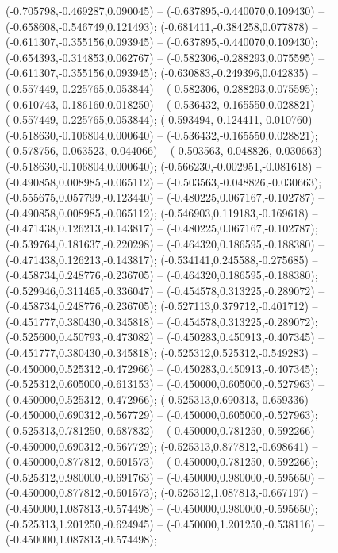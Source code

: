  (-0.705798,-0.469287,0.090045) -- (-0.637895,-0.440070,0.109430) -- (-0.658608,-0.546749,0.121493);
 (-0.681411,-0.384258,0.077878) -- (-0.611307,-0.355156,0.093945) -- (-0.637895,-0.440070,0.109430);
 (-0.654393,-0.314853,0.062767) -- (-0.582306,-0.288293,0.075595) -- (-0.611307,-0.355156,0.093945);
 (-0.630883,-0.249396,0.042835) -- (-0.557449,-0.225765,0.053844) -- (-0.582306,-0.288293,0.075595);
 (-0.610743,-0.186160,0.018250) -- (-0.536432,-0.165550,0.028821) -- (-0.557449,-0.225765,0.053844);
 (-0.593494,-0.124411,-0.010760) -- (-0.518630,-0.106804,0.000640) -- (-0.536432,-0.165550,0.028821);
 (-0.578756,-0.063523,-0.044066) -- (-0.503563,-0.048826,-0.030663) -- (-0.518630,-0.106804,0.000640);
 (-0.566230,-0.002951,-0.081618) -- (-0.490858,0.008985,-0.065112) -- (-0.503563,-0.048826,-0.030663);
 (-0.555675,0.057799,-0.123440) -- (-0.480225,0.067167,-0.102787) -- (-0.490858,0.008985,-0.065112);
 (-0.546903,0.119183,-0.169618) -- (-0.471438,0.126213,-0.143817) -- (-0.480225,0.067167,-0.102787);
 (-0.539764,0.181637,-0.220298) -- (-0.464320,0.186595,-0.188380) -- (-0.471438,0.126213,-0.143817);
 (-0.534141,0.245588,-0.275685) -- (-0.458734,0.248776,-0.236705) -- (-0.464320,0.186595,-0.188380);
 (-0.529946,0.311465,-0.336047) -- (-0.454578,0.313225,-0.289072) -- (-0.458734,0.248776,-0.236705);
 (-0.527113,0.379712,-0.401712) -- (-0.451777,0.380430,-0.345818) -- (-0.454578,0.313225,-0.289072);
 (-0.525600,0.450793,-0.473082) -- (-0.450283,0.450913,-0.407345) -- (-0.451777,0.380430,-0.345818);
 (-0.525312,0.525312,-0.549283) -- (-0.450000,0.525312,-0.472966) -- (-0.450283,0.450913,-0.407345);
 (-0.525312,0.605000,-0.613153) -- (-0.450000,0.605000,-0.527963) -- (-0.450000,0.525312,-0.472966);
 (-0.525313,0.690313,-0.659336) -- (-0.450000,0.690312,-0.567729) -- (-0.450000,0.605000,-0.527963);
 (-0.525313,0.781250,-0.687832) -- (-0.450000,0.781250,-0.592266) -- (-0.450000,0.690312,-0.567729);
 (-0.525313,0.877812,-0.698641) -- (-0.450000,0.877812,-0.601573) -- (-0.450000,0.781250,-0.592266);
 (-0.525312,0.980000,-0.691763) -- (-0.450000,0.980000,-0.595650) -- (-0.450000,0.877812,-0.601573);
 (-0.525312,1.087813,-0.667197) -- (-0.450000,1.087813,-0.574498) -- (-0.450000,0.980000,-0.595650);
 (-0.525313,1.201250,-0.624945) -- (-0.450000,1.201250,-0.538116) -- (-0.450000,1.087813,-0.574498);
